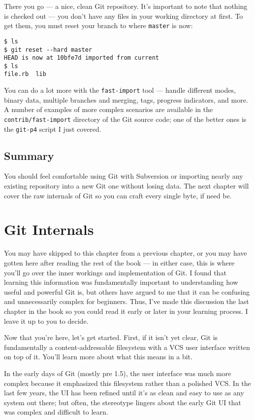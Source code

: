 \documentclass[a4paper]{book}
\newcounter{tab}[chapter]
\newcommand{\chap}[1]{\newpage\thispagestyle{empty}\chapter{#1}\label{chap:\thechapter}}
\begin{document}
There you go --- a nice, clean Git repository. It's important to note that nothing is checked out --- you don't have any files in your working directory at first. To get them, you must reset your branch to where \texttt{master} is now:

\begin{shaded}\begin{verbatim}
$ ls
$ git reset --hard master
HEAD is now at 10bfe7d imported from current
$ ls
file.rb  lib
\end{verbatim}\end{shaded}

You can do a lot more with the \texttt{fast-import} tool --- handle different modes, binary data, multiple branches and merging, tags, progress indicators, and more. A number of examples of more complex scenarios are available in the \texttt{contrib/fast-import} directory of the Git source code; one of the better ones is the \texttt{git-p4} script I just covered.

\section{Summary}\label{summary-8}

You should feel comfortable using Git with Subversion or importing nearly any existing repository into a new Git one without losing data. The next chapter will cover the raw internals of Git so you can craft every single byte, if need be.

\chap{Git Internals}\label{git-internals}

You may have skipped to this chapter from a previous chapter, or you may have gotten here after reading the rest of the book --- in either case, this is where you'll go over the inner workings and implementation of Git. I found that learning this information was fundamentally important to understanding how useful and powerful Git is, but others have argued to me that it can be confusing and unnecessarily complex for beginners. Thus, I've made this discussion the last chapter in the book so you could read it early or later in your learning process. I leave it up to you to decide.

Now that you're here, let's get started. First, if it isn't yet clear, Git is fundamentally a content-addressable filesystem with a VCS user interface written on top of it. You'll learn more about what this means in a bit.

In the early days of Git (mostly pre 1.5), the user interface was much more complex because it emphasized this filesystem rather than a polished VCS. In the last few years, the UI has been refined until it's as clean and easy to use as any system out there; but often, the stereotype lingers about the early Git UI that was complex and difficult to learn.
\end{document}

